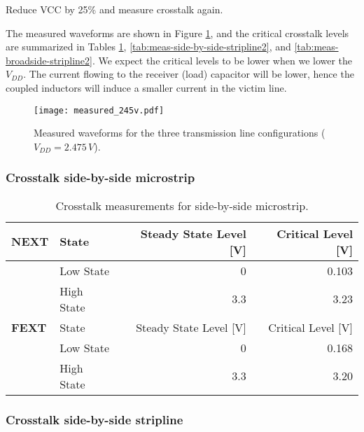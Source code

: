 \documentclass[../main.tex]{subfiles}
\begin{document}
Reduce VCC by 25\% and measure crosstalk again.

\solution

The measured waveforms are shown in Figure \ref{fig:meas-waveforms2}, and the critical crosstalk levels are summarized in Tables \ref{tab:meas-side-by-side-microstrip2}, \ref{tab:meas-side-by-side-stripline2}, and \ref{tab:meas-broadside-stripline2}. We expect the critical levels to be lower when we lower the $V_{DD}$. The current flowing to the receiver (load) capacitor will be lower, hence the coupled inductors will induce a smaller current in the victim line.

\begin{figure}[h]
    \centering
    \texttt{[image: measured\_245v.pdf]}
    \caption{Measured waveforms for the three transmission line configurations ($V_{DD} = 2.475\,\si{V}$).}
    \label{fig:meas-waveforms2}
\end{figure}

\newpage

\subsubsection{Crosstalk side-by-side microstrip}

\begin{table}[h]
    \centering
    \begin{tabular}{l l|r r}
        \toprule[1pt]
        \textbf{NEXT} & State & Steady State Level [V] & Critical Level [V] \\
        \midrule
        & Low State & 0 & 0.103 \\
        & High State & 3.3 & 3.23 \\
        \midrule[1pt]
        \textbf{FEXT} & State & Steady State Level [V] & Critical Level [V] \\
        \midrule
        & Low State & 0 & 0.168 \\
        & High State & 3.3 & 3.20 \\
        \bottomrule[1pt]
    \end{tabular}
    \caption{Crosstalk measurements for side-by-side microstrip.}
    \label{tab:meas-side-by-side-microstrip2}
\end{table}

\subsubsection{Crosstalk side-by-side stripline}
\end{document}
